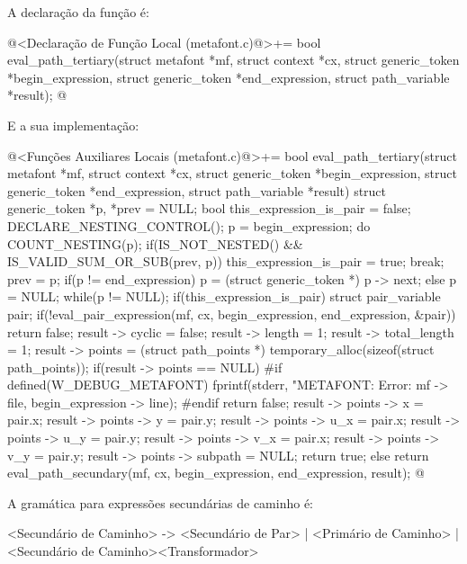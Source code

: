 {A declaração da função é:

\iniciocodigo
@<Declaração de Função Local (metafont.c)@>+=
bool eval_path_tertiary(struct metafont *mf, struct context *cx,
                        struct generic_token *begin_expression,
                        struct generic_token *end_expression,
                        struct path_variable *result);
@
\fimcodigo

E a sua implementação:

\iniciocodigo
@<Funções Auxiliares Locais (metafont.c)@>+=
bool eval_path_tertiary(struct metafont *mf, struct context *cx,
                        struct generic_token *begin_expression,
                        struct generic_token *end_expression,
                        struct path_variable *result){
  struct generic_token *p, *prev = NULL;
  bool this_expression_is_pair = false;
  DECLARE_NESTING_CONTROL();
  p = begin_expression;
  do{
    COUNT_NESTING(p);
    if(IS_NOT_NESTED() && IS_VALID_SUM_OR_SUB(prev, p)){
      this_expression_is_pair = true;
      break;
    }
    prev = p;
    if(p != end_expression)
      p = (struct generic_token *) p -> next;
    else
      p = NULL;
  }while(p != NULL);
  if(this_expression_is_pair){
    struct pair_variable pair;
    if(!eval_pair_expression(mf, cx, begin_expression, end_expression,
                            &pair))
      return false;
    result -> cyclic = false;
    result -> length = 1;
    result -> total_length = 1;
    result -> points = (struct path_points *)
                         temporary_alloc(sizeof(struct path_points));
    if(result -> points == NULL){
#if defined(W_DEBUG_METAFONT)
      fprintf(stderr, "METAFONT: Error: %
              mf -> file, begin_expression -> line);
#endif
      return false;
    }
    result -> points -> x = pair.x;
    result -> points -> y = pair.y;
    result -> points -> u_x = pair.x;
    result -> points -> u_y = pair.y;
    result -> points -> v_x = pair.x;
    result -> points -> v_y = pair.y;
    result -> points -> subpath = NULL;
    return true;
  }
  else
    return eval_path_secundary(mf, cx, begin_expression, end_expression,
                               result);
}
@
\fimcodigo


A gramática para expressões secundárias de caminho é:

\alinhaverbatim
<Secundário de Caminho> -> <Secundário de Par> | <Primário de Caminho> |
                           <Secundário de Caminho><Transformador>
\alinhanormal

}
